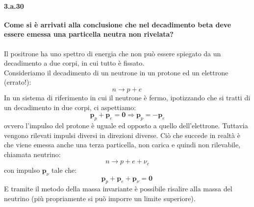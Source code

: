 \documentclass[twoside]{article}
\begin{document}
\paragraph{3.a.30}\textbf{Come si è arrivati alla conclusione che nel decadimento beta deve essere emessa una particella neutra non rivelata?}\\
\\
Il positrone ha uno spettro di energia che non può essere spiegato da un decadimento a due corpi, in cui tutto è fissato.\\
Consideriamo il decadimento di un neutrone in un protone ed un elettrone (errato!):
\begin{equation*}
n\longrightarrow p+e \, 
\end{equation*} 
In un sistema di riferimento in cui il neutrone è fermo, ipotizzando che si tratti di un decadimento in due corpi, ci aspettiamo:
\begin{equation*}
\mathbf{p}_p+\mathbf{p}_e=\mathbf{0} \Rightarrow \mathbf{p}_p=-\mathbf{p}_e
\end{equation*}
ovvero l'impulso del protone è uguale ed opposto a quello dell'elettrone. Tuttavia vengono rilevati impulsi diversi in direzioni diverse. Ciò che succede in realtà è che viene emessa anche una terza particella, non carica e quindi non rilevabile, chiamata neutrino:
\begin{equation*}
n\longrightarrow p+e+ \nu_e 
\end{equation*}
con impulso $\mathbf{p}_\nu$ tale che:
\begin{equation*}
\mathbf{p}_p+\mathbf{p}_e+\mathbf{p}_\nu=\mathbf{0} \, 
\end{equation*}
E tramite il metodo della massa invariante è possibile risalire alla massa del neutrino (più propriamente si può imporre un limite superiore).
\end{document}
